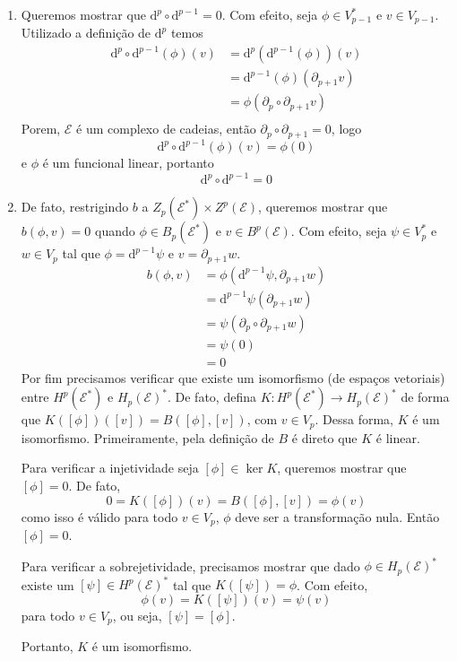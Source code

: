 \documentclass[a4paper, 11pt]{article}
\newcommand{\cE}{\mathcal E}
\newcommand{\rd}{\mathrm d}
\newcommand{\del}{\partial}
\begin{document}
\begin{enumerate}[leftmargin=*, label=\alph*.]
    \item Queremos mostrar que $\rd^p \circ \rd^{p-1} = 0$.
    Com efeito, seja $\phi \in V^*_{p-1}$ e $v \in V_{p-1}$.
    Utilizado a definição de $\rd^p$ temos
    \begin{align*}
        \rd^p \circ \rd^{p-1}(\phi)(v) &= \rd^p (\rd^{p-1} (\phi))(v)\\
        &= \rd^{p-1}(\phi)(\del_{p+1} v)\\
        &= \phi(\del_p \circ \del_{p+1} v)\\
    \end{align*}
    Porem, $\cE$ é um complexo de cadeias, então $\del_p \circ \del_{p+1} = 0$, logo
    \[
        \rd^p \circ \rd^{p-1}(\phi)(v) = \phi(0)
    \]
    e $\phi$ é um funcional linear, portanto
    \[
        \rd^p \circ \rd^{p-1} = 0
    \]

    \item De fato, restrigindo $b$ a $Z_p(\cE^*) \times Z^p(\cE)$, queremos mostrar que $b(\phi, v) = 0$ quando $\phi \in B_p(\cE^*)$ e $v \in B^p(\cE)$.
    Com efeito, seja $\psi \in V^*_p$ e $w  \in V_p$ tal que $\phi = \rd^{p-1} \psi$ e $v = \del_{p+1} w$.
    \begin{align*}
        b(\phi,v) &= \phi(\rd^{p-1}\psi, \del_{p+1}w)\\
        &= \rd^{p-1} \psi (\del_{p+1}w)\\
        &= \psi(\del_p \circ \del_{p+1}w)\\
        &= \psi(0)\\
        &= 0 
    \end{align*}
    Por fim precisamos verificar que existe um isomorfismo (de espaços vetoriais) entre $H^p (\cE^*)$ e $H_p(\cE)^*$.
    De fato, defina $K : H^p (\cE^*) \to H_p(\cE)^*$ de forma que $K([\phi])([v]) = B([\phi], [v])$, com $v \in V_p$.
    Dessa forma, $K$ é um isomorfismo.
    Primeiramente, pela definição de $B$ é direto que $K$ é linear.

    Para verificar a injetividade seja $[\phi] \in \ker K$, queremos mostrar que $[\phi] = 0$.
    De fato,
    \[
        0 = K([\phi])(v) = B([\phi], [v]) = \phi(v)
    \]
    como isso é válido para todo $v \in V_p$, $\phi$ deve ser a transformação nula.
    Então $[\phi] = 0$.

    Para verificar a sobrejetividade, precisamos mostrar que dado $\phi \in H_p(\cE)^*$ existe um $[\psi] \in H^p(\cE)^*$ tal que $K([\psi]) = \phi$.
    Com efeito,
    \[
        \phi(v) = K([\psi])(v) = \psi(v)
    \]
    para todo $v \in V_p$, ou seja, $[\psi] = [\phi]$.

    Portanto, $K$ é um isomorfismo.
\end{enumerate}
\end{document}
